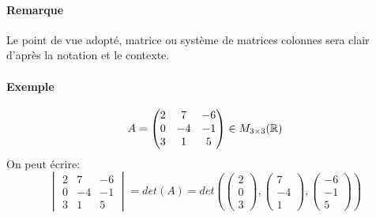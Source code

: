 \paragraph{Remarque} Le point de vue adopté, matrice ou système de matrices colonnes sera clair d'après la notation et le contexte.

\paragraph{Exemple}
$$A = \begin{pmatrix} 2 & 7 & -6 \\ 0 & -4 & -1 \\ 3 & 1 & 5 \end{pmatrix} \in M_{3 \times 3}(\mathbb{R})$$
On peut écrire:
$$\begin{vmatrix} 
  2 & 7 & -6 \\ 
  0 & -4 & -1 \\ 
  3 & 1 & 5 
\end{vmatrix} = det(A) = det\left(\begin{pmatrix} 2 \\ 0 \\ 3 \end{pmatrix}, \begin{pmatrix} 7 \\ -4 \\ 1 \end{pmatrix}, \begin{pmatrix} -6 \\ -1 \\ 5 \end{pmatrix}\right)$$

